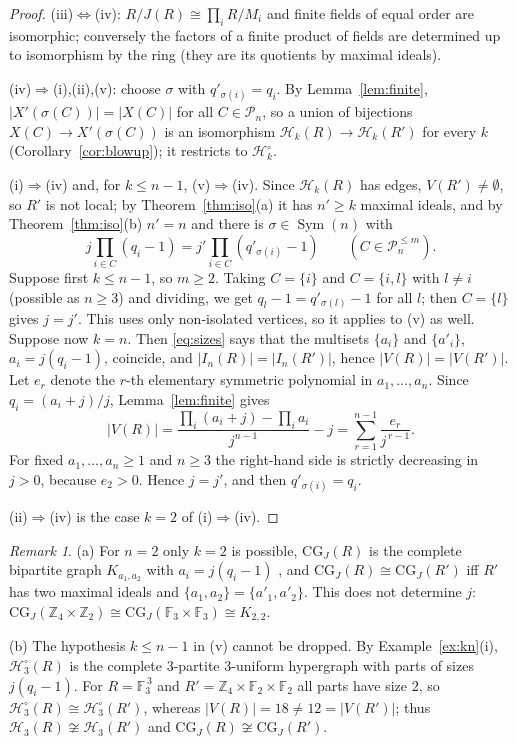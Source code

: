 \documentclass{amsart}
\theoremstyle{definition}
\theoremstyle{remark}
\newtheorem{remark}[theorem]{Remark}
\newcommand{\Sym}{\operatorname{Sym}}
\newcommand{\CG}{\mathrm{CG}_J}
\newcommand{\cP}{\mathcal{P}}
\newcommand{\cH}{\mathcal{H}}
\begin{document}
\begin{proof}
(iii)$\Leftrightarrow$(iv): $R/J(R)\cong\prod_i R/M_i$ and finite fields of equal order are isomorphic; conversely the factors of a finite product of fields are determined up to isomorphism by the ring (they are its quotients by maximal ideals).

(iv)$\Rightarrow$(i),(ii),(v): choose $\sigma$ with $q'_{\sigma(i)}=q_i$. By Lemma~\ref{lem:finite}, $|X'(\sigma(C))|=|X(C)|$ for all $C\in\cP_n$, so a union of bijections $X(C)\to X'(\sigma(C))$ is an isomorphism $\cH_k(R)\to\cH_k(R')$ for every $k$ (Corollary~\ref{cor:blowup}); it restricts to $\cH_k^\circ$.

(i)$\Rightarrow$(iv) and, for $k\le n-1$, (v)$\Rightarrow$(iv). Since $\cH_k(R)$ has edges, $V(R')\ne\emptyset$, so $R'$ is not local; by Theorem~\ref{thm:iso}(a) it has $n'\ge k$ maximal ideals, and by Theorem~\ref{thm:iso}(b) $n'=n$ and there is $\sigma\in\Sym(n)$ with
\begin{equation}\label{eq:sizes}
j\prod_{i\in C}(q_i-1)=j'\prod_{i\in C}(q'_{\sigma(i)}-1)\qquad(C\in\cP_n^{\le m}).
\end{equation}
Suppose first $k\le n-1$, so $m\ge2$. Taking $C=\{i\}$ and $C=\{i,l\}$ with $l\ne i$ (possible as $n\ge3$) and dividing, we get $q_l-1=q'_{\sigma(l)}-1$ for all $l$; then $C=\{l\}$ gives $j=j'$. This uses only non-isolated vertices, so it applies to (v) as well.
Suppose now $k=n$. Then \eqref{eq:sizes} says that the multisets $\{a_i\}$ and $\{a'_i\}$, $a_i=j(q_i-1)$, coincide, and $|I_n(R)|=|I_n(R')|$, hence $|V(R)|=|V(R')|$. Let $e_r$ denote the $r$-th elementary symmetric polynomial in $a_1,\dots,a_n$. Since $q_i=(a_i+j)/j$, Lemma~\ref{lem:finite} gives
\[
|V(R)|=\frac{\prod_i(a_i+j)-\prod_i a_i}{j^{n-1}}-j=\sum_{r=1}^{n-1}\frac{e_r}{j^{\,r-1}} .
\]
For fixed $a_1,\dots,a_n\ge1$ and $n\ge3$ the right-hand side is strictly decreasing in $j>0$, because $e_2>0$. Hence $j=j'$, and then $q'_{\sigma(i)}=q_i$.

(ii)$\Rightarrow$(iv) is the case $k=2$ of (i)$\Rightarrow$(iv).
\end{proof}

\begin{remark}\label{rem:n2}
(a) For $n=2$ only $k=2$ is possible, $\CG(R)$ is the complete bipartite graph $K_{a_1,a_2}$ with $a_i=j(q_i-1)$ \cite[Theorem~2.2]{MSSY08}, and $\CG(R)\cong\CG(R')$ iff $R'$ has two maximal ideals and $\{a_1,a_2\}=\{a'_1,a'_2\}$. This does not determine $j$: $\CG(\mathbb Z_4\times\mathbb Z_2)\cong\CG(\mathbb F_3\times\mathbb F_3)\cong K_{2,2}$.

(b) The hypothesis $k\le n-1$ in (v) cannot be dropped. By Example~\ref{ex:kn}(i), $\cH_3^\circ(R)$ is the complete $3$-partite $3$-uniform hypergraph with parts of sizes $j(q_i-1)$. For $R=\mathbb F_3^{\,3}$ and $R'=\mathbb Z_4\times\mathbb F_2\times\mathbb F_2$ all parts have size $2$, so $\cH_3^\circ(R)\cong\cH_3^\circ(R')$, whereas $|V(R)|=18\ne 12=|V(R')|$; thus $\cH_3(R)\not\cong\cH_3(R')$ and $\CG(R)\not\cong\CG(R')$.
\end{remark}
\end{document}
